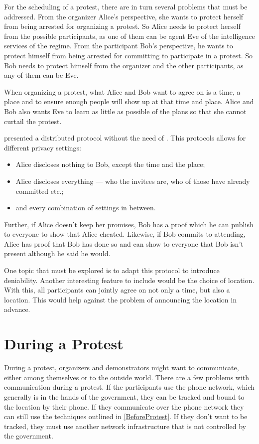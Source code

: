 \documentclass[a4paper]{llncs}
\begin{document}
For the scheduling of a protest, there are in turn several problems that must 
be addressed.
From the organizer Alice's perspective, she wants to protect herself from being 
arrested for organizing a protest.
So Alice needs to protect herself from the possible participants, as one of 
them can be agent Eve of the intelligence services of the regime.
From the participant Bob's perspective, he wants to protect himself from being 
arrested for committing to participate in a protest.
So Bob needs to protect himself from the organizer and the other participants, 
as any of them can be Eve.

When organizing a protest, what Alice and Bob want to agree on is a time, 
a place and to ensure enough people will show up at that time and place.
Alice and Bob also wants Eve to learn as little as possible of the plans so 
that she cannot curtail the protest.

\citet{EventsInvitations} presented a distributed protocol without the need of 
.
This protocols allows for different privacy settings:
\begin{itemize}
\item Alice discloses nothing to Bob, except the time and the place;
\item Alice discloses everything --- who the invitees are, who of those have 
  already committed etc.;
\item and every combination of settings in between.
\end{itemize}
Further, if Alice doesn't keep her promises, Bob has a proof which he can 
publish to everyone to show that Alice cheated.
Likewise, if Bob commits to attending, Alice has proof that Bob has done so and 
can show to everyone that Bob isn't present although he said he would.

One topic that must be explored is to adapt this protocol to introduce 
deniability.
Another interesting feature to include would be the choice of location.
With this, all participants can jointly agree on not only a time, but also 
a location.
This would help against the problem of announcing the location in advance.

\section{During a Protest}
\label{DuringProtest}

During a protest, organizers and demonstrators might want to communicate, 
either among themselves or to the outside world.
There are a few problems with communication during a protest.
If the participants use the phone network, which generally is in the hands of 
the government, they can be tracked and bound to the location by their phone.
If they communicate over the phone network they can still use the techniques 
outlined in \cref{BeforeProtest}.
If they don't want to be tracked, they must use another network infrastructure 
that is not controlled by the government.
\end{document}

